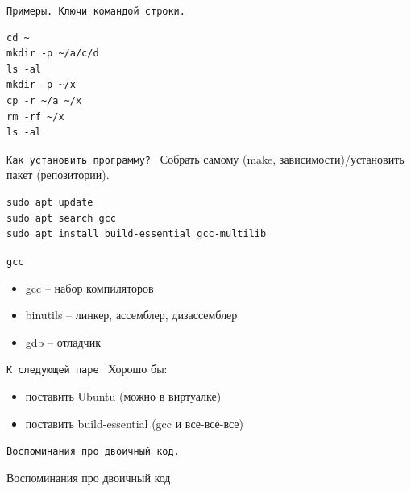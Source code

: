 \documentclass[pdf, 10pt, unicode]{beamer}
\begin{document}
\begin{frame}[fragile]{{\tt Примеры. Ключи командой строки. }}
\begin{verbatim}
cd ~
mkdir -p ~/a/c/d
ls -al
mkdir -p ~/x
cp -r ~/a ~/x
rm -rf ~/x
ls -al
\end{verbatim}
\end{frame}

\begin{frame}[fragile]{{\tt Как установить программу? }}
Собрать самому (make, зависимости)/установить пакет (репозитории).
\begin{verbatim}
sudo apt update
sudo apt search gcc
sudo apt install build-essential gcc-multilib
\end{verbatim}
\end{frame}

\begin{frame}[fragile]{{\tt gcc }}
  \begin{itemize}
    \item gcc -- набор компиляторов
    \item binutils -- линкер, ассемблер, дизассемблер
    \item gdb -- отладчик
  \end{itemize}
\end{frame}

\begin{frame}[fragile]{{\tt К следующей паре }}
  Хорошо бы:
  \begin{itemize}
    \item поставить Ubuntu (можно в виртуалке)
    \item поставить build-essential (gcc и все-все-все)
  \end{itemize}
\end{frame}

\begin{frame}[fragile]{{\tt Воспоминания про двоичный код.}}

\begin{center}
  \huge{Воспоминания про двоичный код}
\end{center}

\end{frame}
\end{document}
